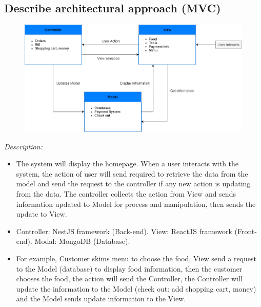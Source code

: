 \documentclass[11pt]{article}
\begin{document}
    \subsection{Describe architectural approach (MVC)}
    \begin{figure}[!h]
        \centering
        \includegraphics[scale=0.52]{MCV.png}
    \end{figure}
    \textit{Description:}
    \begin{itemize}
        \item The system will display the homepage. When a user interacts with the system, the action of user will send required to retrieve the data from the model and send the request to the controller if any new action is updating from the data. The controller collects the action from View and sends information updated to Model for process and manipulation, then sends the update to View.
        \item Controller: NestJS framework (Back-end). View: ReactJS framework (Front-end). Modal: MongoDB (Database).
        \item For example, Customer skims menu to choose the food, View send a request to the Model (database) to display food information, then the customer chooses the food, the action will send the Controller, the Controller will update the information to the Model (check out: add shopping cart, money) and the Model sends update information to the View.
    \end{itemize}
    \newpage
\end{document}
